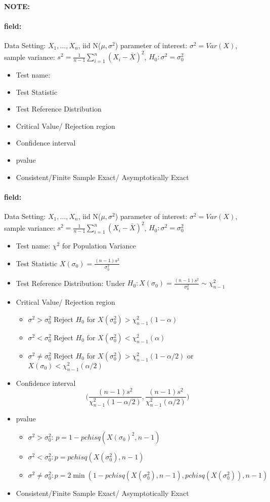 \documentclass[12pt]{article}
\newenvironment{note}{\paragraph{NOTE:}}{}
\newenvironment{field}{\paragraph{field:}}{}
\begin{document}
\begin{note}
 \begin{field}
  Data Setting: $X_1, \ldots, X_n$, iid N($\mu,\sigma^2$) parameter of interest: $\sigma^2 = Var(X)$, sample variance: $s^2 = \frac{1}{n-1} \sum_{i=1}^n(X_i - \bar{X})^2$, $H_0: \sigma^2 = \sigma_0^2$
  \begin{itemize}
   \item Test name:
   \item Test Statistic
   \item Test Reference Distribution
   \item Critical Value/ Rejection region
   \item Confidence interval
   \item pvalue
   \item Consistent/Finite Sample Exact/ Asymptotically Exact
  \end{itemize}
 \end{field}
 \begin{field}
  Data Setting: $X_1, \ldots, X_n$, iid N($\mu,\sigma^2$) parameter of interest: $\sigma^2 = Var(X)$, sample variance: $s^2 = \frac{1}{n-1} \sum_{i=1}^n(X_i - \bar{X})^2$, $H_0: \sigma^2 = \sigma_0^2$
  \begin{itemize}
   \item Test name: $\chi^2$ for Population Variance
   \item Test Statistic $X(\sigma_0) = \frac{(n-1)s^2}{\sigma_0^2}$
   \item Test Reference Distribution: Under $H_0: X(\sigma_0) = \frac{(n-1)s^2}{\sigma_0^2} \sim \chi_{n-1}^2$
   \item Critical Value/ Rejection region
         \begin{itemize}
          \item  $\sigma^2 > \sigma_0^2$ Reject $H_0$ for $X(\sigma_0^2) > \chi^2_{n-1}(1-\alpha)$
          \item $\sigma^2 < \sigma_0^2$ Reject $H_0$ for $X(\sigma_0^2) < \chi^2_{n-1}(\alpha)$
          \item $\sigma^2 \neq \sigma_0^2$ Reject $H_0$ for $X(\sigma_0^2) > \chi^2_{n-1}(1 - \alpha/2)$ or $X(\sigma_0) < \chi^2_{n-1}(\alpha/2)$
         \end{itemize}
   \item Confidence interval  $$ \bigg( \frac{(n-1)s^2}{\chi^2_{n-1}(1 - \alpha/2)}, \frac{(n-1)s^2}{\chi^2_{n-1}(\alpha/2)}\bigg)$$
   \item pvalue
         \begin{itemize}
          \item $\sigma^2 > \sigma_0^2$: $p = 1 - pchisq(X(\sigma_0)^2,n-1)$
          \item $\sigma^2 < \sigma_0^2: p = pchisq(X(\sigma_0^2),n-1)$
          \item $\sigma^2 \neq \sigma_0^2: p = 2\min(1 - pchisq(X(\sigma_0^2), n-1), pchisq(X(\sigma_0^2)),n-1)$
         \end{itemize}
   \item Consistent/Finite Sample Exact/ Asymptotically Exact
  \end{itemize}
 \end{field}
\end{note}
\end{document}

